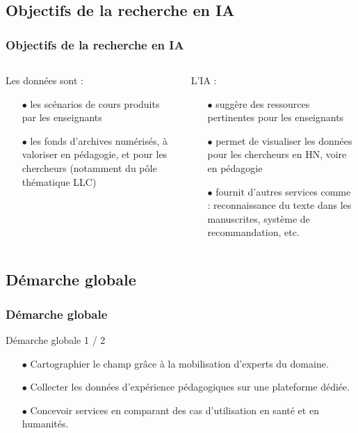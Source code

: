 \documentclass[xcolor=dvipsnames]{beamer}
\begin{document}
\subsection{Objectifs de la recherche en IA
}
\begin{frame}[fragile]
\frametitle{Objectifs de la recherche en IA
}
\begin{columns}
	\begin{block}{Les données sont :}
		\begin{itemize}
			\item[$\bullet$]les scénarios de cours produits par les enseignants
			\item[$\bullet$]les fonds d’archives numérisés, à valoriser en pédagogie, et pour les chercheurs (notamment du pôle thématique LLC)
		\end{itemize}	
	\end{block}
\vspace{4cm}
	\begin{block}{L'IA :}
		\begin{itemize}
		\item[$\bullet$]suggère des ressources pertinentes pour les enseignants
		\item[$\bullet$]permet de visualiser les données pour les chercheurs en HN, voire en pédagogie
		\item[$\bullet$]fournit d’autres services comme : reconnaissance du texte dans les manuscrites, système de recommandation, etc.
		\end{itemize}
	\end{block}
\vspace{2.5cm}
\end{columns}
\end{frame}

\subsection{Démarche globale}
\begin{frame}[fragile]
\frametitle{Démarche globale
}
\begin{block}{Démarche globale 1 / 2}
	\begin{itemize}
		\item[$\bullet$] Cartographier le champ grâce à la mobilisation d’experts du domaine.
		\item[$\bullet$] Collecter les données d’expérience pédagogiques sur une plateforme dédiée.
		\item[$\bullet$] Concevoir services en comparant des cas d'utilisation en santé et en humanités.
	\end{itemize}
\end{block}
\end{frame}
\end{document}
